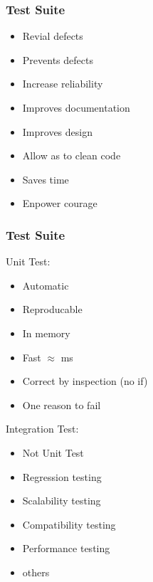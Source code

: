 \begin{frame}
  \frametitle{Test Suite}
  \pause
  \begin{itemize}
    \item Revial defects\pause
    \item Prevents defects\pause
    \item Increase reliability\pause
    \item Improves documentation\pause
    \item Improves design\pause
    \item Allow as to clean code\pause
    \item Saves time\pause
    \item Enpower courage
  \end{itemize}
\end{frame}

\begin{frame}
  \frametitle{Test Suite}
    \begin{minipage}[t]{0.48\linewidth}
        Unit Test:
        \begin{itemize}
          \item Automatic \pause
          \item Reproducable \pause
          \item In memory\pause
          \item Fast $\approx$ ms\pause
          \item Correct by inspection (no if) \pause
          \item One reason to fail\pause
        \end{itemize}
    \end{minipage}\hfill
    \begin{minipage}[t]{0.48\linewidth}
        Integration Test:
        \begin{itemize}
          \item Not Unit Test\pause
          \item Regression testing\pause
          \item Scalability testing\pause
          \item Compatibility testing\pause
          \item Performance testing\pause
          \item others
        \end{itemize}
    \end{minipage}
\end{frame}

